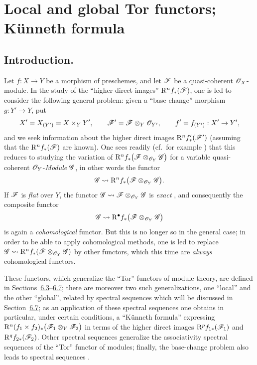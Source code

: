 \section{Local and global Tor functors; K\"unneth formula}
\label{section:III.6}


\subsection{Introduction.}
\label{subsection:III.6.1}


\begin{env}[6.1.1]
\label{III.6.1.1}
Let $f:X\to Y$ be a morphism of preschemes, and let $\mathscr{F}$ be
a quasi-coherent $\mathscr{O}_X$-module.  In the study of the ``higher direct
images'' $\mathrm{R}^n f_*(\mathscr{F})$, one is led to consider the following
general problem: given a ``base change'' morphism $g:Y'\to Y$, put
\[
  X'=X_{(Y')}=X\times_Y Y',\qquad
  \mathscr{F}'=\mathscr{F}\otimes_Y\mathscr{O}_{Y'},\qquad
  f'=f_{(Y')}:X'\to Y',
\]
and we seek information about the higher direct images
$\mathrm{R}^n f'_*(\mathscr{F}')$ (assuming that the
$\mathrm{R}^n f_*(\mathscr{F})$ are known).  One sees readily
(cf.\ for example ) that this reduces to studying
the variation of $\mathrm{R}^n f_*\bigl(\mathscr{F}\otimes_{\mathscr{O}_Y}\mathscr{G}\bigr)$
for a variable quasi-coherent $\mathscr{O}_Y$-\emph{Module} $\mathscr{G}$,
in other words the functor
\[
  \mathscr{G}\leadsto
  \mathrm{R}^n f_*\bigl(\mathscr{F}\otimes_{\mathscr{O}_Y}\mathscr{G}\bigr).
\]
If $\mathscr{F}$ is \emph{flat} over $Y$, the functor
$\mathscr{G}\leadsto\mathscr{F}\otimes_{\mathscr{O}_Y}\mathscr{G}$ is \emph{exact}
, and consequently the composite functor
\[
  \mathscr{G}\leadsto
  \mathrm{R}^\bullet f_*\bigl(\mathscr{F}\otimes_{\mathscr{O}_Y}\mathscr{G}\bigr)
\]
is again a \emph{cohomological} functor.  But this is no longer so in
the general case; in order to be able to apply cohomological methods, one is
led to replace
$\mathscr{G}\leadsto
\mathrm{R}^n f_*(\mathscr{F}\otimes_{\mathscr{O}_Y}\mathscr{G})$
by other functors, which this time are \emph{always} cohomological functors.

These functors, which generalize the ``Tor'' functors of module theory,
are defined in Sections~\hyperref[subsection:III.6.3]{6.3}--\hyperref[subsection:III.6.7]{6.7}; there are moreover two such
generalizations, one ``local'' and the other ``global'', related by spectral
sequences which will be discussed in Section~\hyperref[subsection:III.6.7]{6.7}; as an application of these
spectral sequences one obtains in particular, under certain conditions, a
``K\"unneth formula'' expressing $\mathrm{R}^n(f_1\times f_2)_*
\bigl(\mathscr{F}_1\otimes_Y\mathscr{F}_2\bigr)$
in terms of the higher direct images
$\mathrm{R}^p f_{1*}(\mathscr{F}_1)$ and
$\mathrm{R}^q f_{2*}(\mathscr{F}_2)$.  Other spectral sequences
 generalize the associativity spectral sequences of
the ``Tor'' functor of modules; finally, the base-change problem also
leads to spectral sequences .
\end{env}

